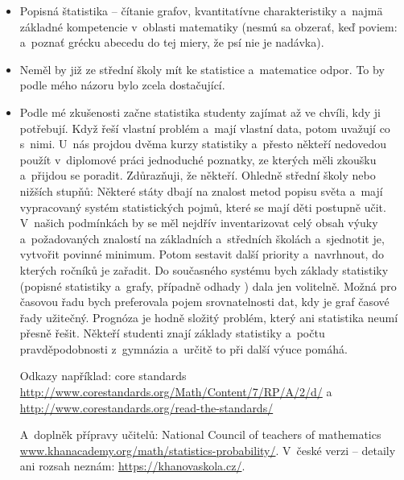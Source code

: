 \enlargethispage{-1.5\baselineskip}
\begin{itemize}
\item Popisná štatistika -- čítanie grafov, kvantitatívne charakteristiky a~naj\-mä základné kompetencie v~oblasti matematiky (nesmú sa obzerať, keď poviem:  a~poznať grécku abecedu do tej miery, že psí nie je nadávka).
\item Neměl by již ze střední školy mít ke statistice a~matematice odpor. To by podle mého názoru bylo zcela dostačující.
\item Podle mé zkušenosti začne statistika studenty zajímat až ve chvíli, kdy ji potřebují. Když řeší vlastní problém a~mají vlastní data, potom uvažují co s~nimi. U~nás projdou dvěma kurzy statistiky a~přesto někteří nedovedou použít v~diplomové práci jednoduché poznatky, ze kterých měli zkoušku a~přijdou se poradit. Zdůrazňuji, že někteří. Ohledně střední školy nebo nižších stupňů: Některé státy dbají na znalost metod popisu světa a~mají vypracovaný systém statistických pojmů, které se mají děti postupně učit. V~našich podmínkách by se měl nejdřív inventarizovat celý obsah výuky a~požadovaných znalostí na základních a~středních školách a~sjednotit je, vytvořit povinné minimum. Potom sestavit dal\-ší priority a~navrhnout, do kterých ročníků je zařadit. Do současného systému bych základy statistiky (popisné statistiky a~grafy, případně odhady ) dala jen volitelně. Možná pro časovou řadu bych preferovala pojem srovnatelnosti dat, kdy je graf časové řady užitečný. Prognóza je hodně složitý problém, který ani statistika neumí přesně řešit. Někteří studenti znají základy statistiky a~počtu pravděpodobnosti z~gymnázia a~určitě to při další výuce pomáhá.

Odkazy například: core standards\\
\href{http://www.corestandards.org/Math/Content/7/RP/A/2/d/}{\url{http://www.corestandards.org/Math/Content/7/RP/A/2/d/}} a\\
\href{http://www.corestandards.org/read-the-standards/}{\url{http://www.corestandards.org/read-the-standards/}}

A~doplněk přípravy učitelů: National Council of teachers of mathematics
\href{https://www.khanacademy.org/math/statistics-probability/}{\url{www.khanacademy.org/math/statistics-probability/}}.
V~české verzi -- detaily ani rozsah neznám:
\href{https://khanovaskola.cz/}{\url{https://khanovaskola.cz/}}.


\end{itemize}
